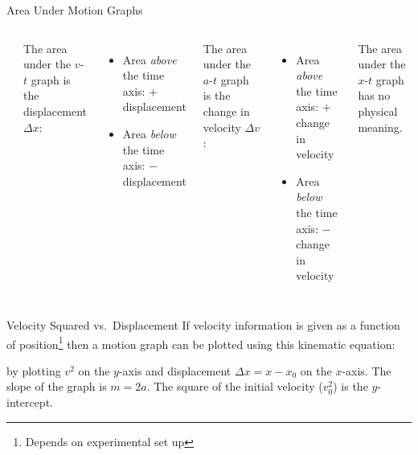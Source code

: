 \documentclass[12pt,compress,aspectratio=169]{beamer}
\newcommand{\eq}[2]{\vspace{#1}{\Large\begin{displaymath}#2\end{displaymath}}}
\begin{document}
\begin{frame}{Area Under Motion Graphs}
  \begin{columns}
    \begin{center}
    \end{center}
    
    The area under the $v$-$t$ graph is the displacement $\Delta x$:
    \begin{itemize}
    \item Area \textcolor{blue!20}{\emph{above}} the time axis: $+$
      displacement
    \item Area \textcolor{red!40}{\emph{below}} the time axis: $-$ displacement
    \end{itemize}
    \vspace{.1in}The area under the $a$-$t$ graph is the change in velocity
    $\Delta v$:
    \begin{itemize}
    \item Area \emph{above} the time axis: $+$ change in velocity
    \item Area \emph{below} the time axis: $-$ change in velocity
    \end{itemize}

    \vspace{.1in}The area under the $x$-$t$ graph has no physical meaning.
  \end{columns}
\end{frame}



\begin{frame}{Velocity Squared vs.\ Displacement}
  If velocity information is given as a function of position\footnote{Depends
    on experimental set up} then a motion graph can be plotted using this
  kinematic equation:

  \eq{-.2in}{
    \underbracket{v^2}_y=\underbracket{v_0^2}_b+\underbracket{2a}_m
    \underbracket{(x-x_0)}_x
  }

  by plotting $v^2$ on the $y$-axis and displacement $\Delta x=x-x_0$ on the
  $x$-axis. The slope of the graph is $m=2a$. The square of the initial
  velocity ($v_0^2$) is the $y$-intercept.
\end{frame}
\end{document}
